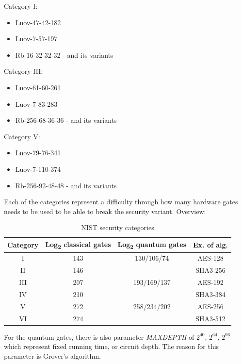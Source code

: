 \documentclass[thesis=M,english]{FITthesis}[2019/12/23]
\begin{document}
\bigskip
\noindent
Category I:
\begin{itemize}
\item Luov-47-42-182
\item Luov-7-57-197
\item Rb-16-32-32-32 - and its variants
\end{itemize}

\noindent
Category III:
\begin{itemize}
\item Luov-61-60-261
\item Luov-7-83-283
\item Rb-256-68-36-36 - and its variants
\end{itemize}

\noindent
Category V:
\begin{itemize}
\item Luov-79-76-341
\item Luov-7-110-374
\item Rb-256-92-48-48 - and its variants
\end{itemize}

\noindent
Each of the categories represent a difficulty through how many hardware gates needs to be used to be able to break the security variant.\cite{L-NIST-STANDARD} Overview:
\begin{table}[H]
\centering
\begin{tabular}{|c|c|c|c|}
\hline
Category & Log\textsubscript{2} classical gates & Log\textsubscript{2} quantum gates  & Ex. of alg.\\ \hline
I         & 143                    & 130/106/74    & AES-128     \\ \hline
II        & 146                    &                      & SHA3-256  \\ \hline
III       & 207                    & 193/169/137  & AES-192     \\ \hline
IV        & 210                    &                     & SHA3-384   \\ \hline
V         & 272                    & 258/234/202 & AES-256      \\ \hline
VI        & 274                    &                     & SHA3-512   \\ \hline
\end{tabular}
\caption{NIST security categories}
\end{table}

\noindent
For the quantum gates, there is also parameter \textit{MAXDEPTH} of $2^{40}$, $2^{64}$, $2^{96}$ which represent fixed running time, or circuit depth. The reason for this parameter is Grover’s algorithm.
\end{document}

